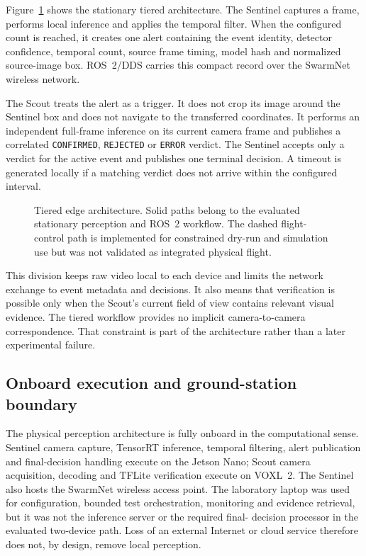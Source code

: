 Figure~\ref{fig:tiered-architecture} shows the stationary tiered architecture.
The Sentinel captures a frame, performs local inference and applies the
temporal filter. When the configured count is reached, it creates one alert
containing the event identity, detector confidence, temporal count, source
frame timing, model hash and normalized source-image box. ROS~2/DDS carries
this compact record over the SwarmNet wireless network.

The Scout treats the alert as a trigger. It does not crop its image around the
Sentinel box and does not navigate to the transferred coordinates. It performs
an independent full-frame inference on its current camera frame and publishes a
correlated \texttt{CONFIRMED}, \texttt{REJECTED} or \texttt{ERROR} verdict. The
Sentinel accepts only a verdict for the active event and publishes one terminal
decision. A timeout is generated locally if a matching verdict does not arrive
within the configured interval.

\begin{figure}[H]
  \centering
  \resizebox{\textwidth}{!}{}
  \caption{Tiered edge architecture. Solid paths belong to the evaluated
  stationary perception and ROS~2 workflow. The dashed flight-control path is
  implemented for constrained dry-run and simulation use but was not validated
  as integrated physical flight.}
  \label{fig:tiered-architecture}
\end{figure}

This division keeps raw video local to each device and limits the network
exchange to event metadata and decisions. It also means that verification is
possible only when the Scout's current field of view contains relevant visual
evidence. The tiered workflow provides no implicit camera-to-camera correspondence.
That constraint is part of the architecture rather than a later experimental
failure.

\subsection{Onboard execution and ground-station boundary}

The physical perception architecture is fully onboard in the computational
sense. Sentinel camera capture, TensorRT inference, temporal filtering, alert
publication and final-decision handling execute on the Jetson Nano; Scout
camera acquisition, decoding and TFLite verification execute on VOXL~2. The
Sentinel also hosts the SwarmNet wireless access point. The laboratory laptop
was used for configuration, bounded test orchestration, monitoring and
evidence retrieval, but it was not the inference server or the required final-
decision processor in the evaluated two-device path. Loss of an external
Internet or cloud service therefore does not, by design, remove local
perception.

